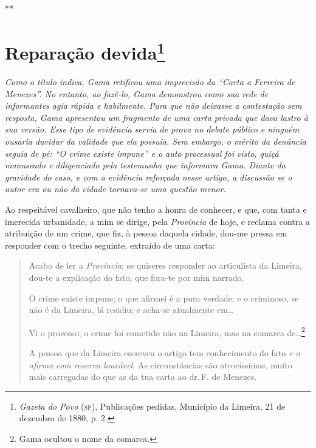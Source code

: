 \medskip

\hfill***
\pagebreak
\section{Reparação devida\protect\footnote{\emph{\MakeUppercase{G}azeta do \MakeUppercase{P}ovo} (\textsc{sp}),
  \MakeUppercase{P}ublicações pedidas, \MakeUppercase{M}unicípio da \MakeUppercase{L}imeira, 21 de dezembro de 1880, p. 2.}}

\begin{resumo}
\emph{Como o título indica, Gama retificou uma imprecisão da ``Carta a
Ferreira de Menezes''. No entanto, ao fazê-lo, Gama demonstrou como
sua rede de informantes agia rápida e habilmente. Para que não deixasse
a contestação sem resposta, Gama apresentou um fragmento de uma carta
privada que dava lastro à sua versão. Esse tipo de evidência servia de
prova no debate público e ninguém ousaria duvidar da validade que ela
possuía. Sem embargo, o mérito da denúncia seguia de pé: ``O crime existe
impune'' e o auto processual foi visto, quiçá manuseado e diligenciado
pela testemunha que informava Gama. Diante da gravidade do caso, e com a
evidência reforçada nesse artigo, a discussão se o autor era ou não da
cidade tornava-se uma questão menor. }
\end{resumo}

Ao respeitável cavalheiro, que não tenho a honra de conhecer, e que, com
tanta e imerecida urbanidade, a mim se dirige, pela \emph{Província} de
hoje, e reclama contra a atribuição de um crime, que fiz, à pessoa
daquela cidade, dou-me pressa em responder com o trecho seguinte,
extraído de uma carta:

\noindent\dotfill{}

\begin{quote}
Acabo de ler a \emph{Província}; se quiseres responder ao articulista
da Limeira, dou-te a explicação do fato, que fora-te por mim narrado.

O crime existe impune; o que afirmei é a pura verdade; e o criminoso, se
não é da Limeira, lá residiu; e acha-se atualmente em\ldots{}

Vi o processo; o crime foi cometido não na Limeira, mas na comarca
de\ldots{}\footnote{Gama ocultou o nome da comarca.}

A pessoa que da Limeira
escreveu o artigo tem conhecimento do fato \emph{e o afirma com reserva
louvável}. As circunstâncias são atrocíssimas, muito mais carregadas do
que as da tua carta ao dr.\,F. de Menezes.
\end{quote}

